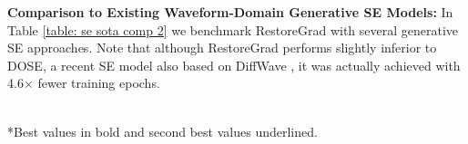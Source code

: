 \noindent\textbf{Comparison to Existing Waveform-Domain Generative SE Models:} 
In Table \ref{table: se sota comp 2} we benchmark RestoreGrad with several generative SE approaches. Note that although RestoreGrad performs slightly inferior to DOSE, a recent SE model also based on DiffWave \citep{kong2020diffwave}, it was actually achieved with 4.6$\times$ fewer training epochs.

\begin{table}[!t]
\centering
\begin{small}
\setlength{\tabcolsep}{5pt} %
\caption{Comparison with existing time-domain, generative SE models.}
\vspace{0.1cm}
\label{table: se sota comp 2}
\\
\vspace{0.1cm}
\scriptsize
*Best values in bold and second best values underlined. 
\end{small}
\end{table}



